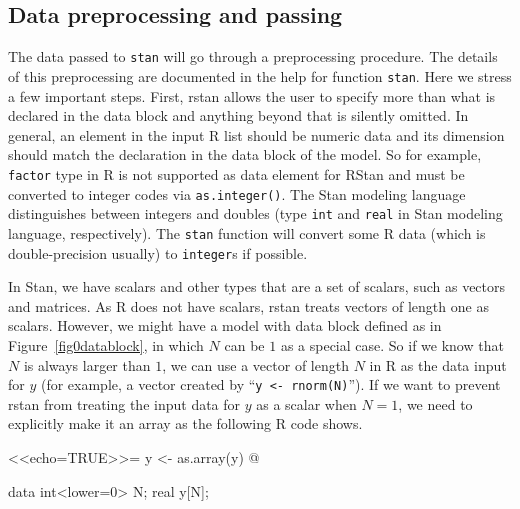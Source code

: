 \documentclass[12pt]{article}
\newcommand{\R}{R\xspace}
\newcommand{\Stan}{Stan\xspace}
\newcommand{\RStan}{RStan\xspace}
\newcommand{\code}[1]{{\tt #1}}
\newcommand{\strong}[1]{\texorpdfstring%
          {{\normalfont\fontseries{b}\selectfont #1}}%
            {#1}}
\let\pkg=\strong
\begin{document}
                \subsection{Data preprocessing and passing}
                
                The data passed to \code{stan} will go through a preprocessing procedure. 
                The details of this preprocessing are documented in the help 
                for function \code{stan}. Here we stress a few important steps.  
                First, \pkg{rstan} allows the user to specify more than what is declared in the data block
                and anything beyond that is silently omitted. In general, an element in the input \R list should 
                be numeric data and its dimension should match the declaration in the data block of the model.
                So for example, \code{factor} type in \R is not supported as data element for \RStan and must
                be converted to integer codes via \code{as.integer()}. The \Stan modeling language 
                distinguishes between integers and doubles (type \code{int} and \code{real} in Stan modeling language, 
                respectively). The \code{stan} function will convert some R data (which is double-precision usually) to 
                \code{integer}s if possible.
                
                In \Stan, we have scalars and other types that are a set of scalars, such as vectors and matrices. 
                As \R does not have scalars, \pkg{rstan} treats vectors of length one as scalars.
                However, we might have a model with data block defined as in Figure~\ref{fig0datablock}, 
                in which $N$ can be $1$ as a special case.
                So if we know that $N$ is always larger than $1$, we can use a vector of length $N$ in \R
                as the data input for $y$ (for example, a vector created by ``\code{y <- rnorm(N)}''). 
                If we want to prevent \pkg{rstan} from treating the input data for $y$ as a scalar when $N=1$,
                we need to explicitly make it an array as the following \R code shows.
                
                <<echo=TRUE>>=
                y <- as.array(y)
                @
                
                
                \begin{verbbox}
                
                data {                
                int<lower=0> N;      
                real y[N];
                } 
                
                \end{verbbox} 
                
\end{document}
